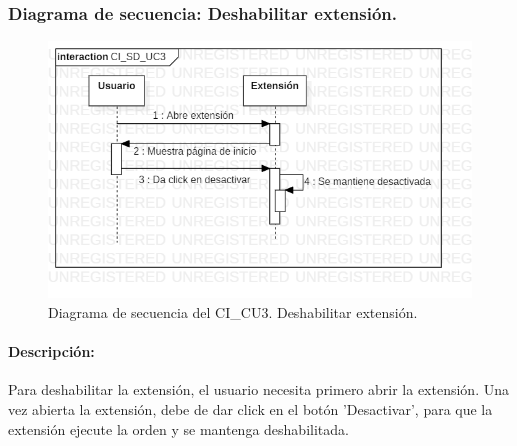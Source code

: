 \documentclass[12pt, a4paper, titlepage]{report}
\begin{document}
    			\subsubsection{Diagrama de secuencia: Deshabilitar extensión.}
    			    \begin{figure}[H]
    				    \begin{center} \includegraphics[width=14cm]{./imagenes/Disenio/Componente_1/CI_SD_UC3.png}
    				    \caption[Diagrama de secuencia 3 del Componente I]{Diagrama de secuencia del CI\_CU3. Deshabilitar extensión.}
    			        \end{center}
    			    \end{figure}
    			    
    			    \paragraph{Descripción:}
    			    Para deshabilitar la extensión, el usuario necesita primero abrir la extensión. Una vez abierta la extensión, debe de dar click en el botón 'Desactivar', para que la extensión ejecute la orden y se mantenga deshabilitada.
    			   
    			
\end{document}
